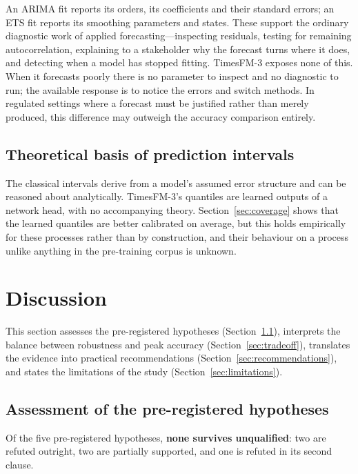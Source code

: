 \documentclass[article]{ajs}
\providecommand{\sectionref}[1]{Section~\ref{#1}}
\begin{document}
An ARIMA fit reports its orders, its coefficients and their standard errors; an ETS fit reports
its smoothing parameters and states. These support the ordinary diagnostic work of applied
forecasting---inspecting residuals, testing for remaining autocorrelation, explaining to a
stakeholder why the forecast turns where it does, and detecting when a model has stopped
fitting. TimesFM-3 exposes none of this. When it forecasts poorly there is no parameter to
inspect and no diagnostic to run; the available response is to notice the errors and switch
methods. In regulated settings where a forecast must be justified rather than merely produced,
this difference may outweigh the accuracy comparison entirely.

\subsection{Theoretical basis of prediction intervals}
\label{sec:intervals}

The classical intervals derive from a model's assumed error structure and can be reasoned about
analytically. TimesFM-3's quantiles are learned outputs of a network head, with no accompanying
theory. \sectionref{sec:coverage} shows that the learned quantiles are better calibrated on
average, but this holds empirically for these processes rather than by construction, and their
behaviour on a process unlike anything in the pre-training corpus is unknown.

\section{Discussion}
\label{sec:discussion}

This section assesses the pre-registered hypotheses (\sectionref{sec:hypotheses}), interprets the
balance between robustness and peak accuracy (\sectionref{sec:tradeoff}), translates the evidence
into practical recommendations (\sectionref{sec:recommendations}), and states the limitations of
the study (\sectionref{sec:limitations}).

\subsection{Assessment of the pre-registered hypotheses}
\label{sec:hypotheses}

Of the five pre-registered hypotheses, \textbf{none survives unqualified}: two are refuted
outright, two are partially supported, and one is refuted in its second clause.
\end{document}
